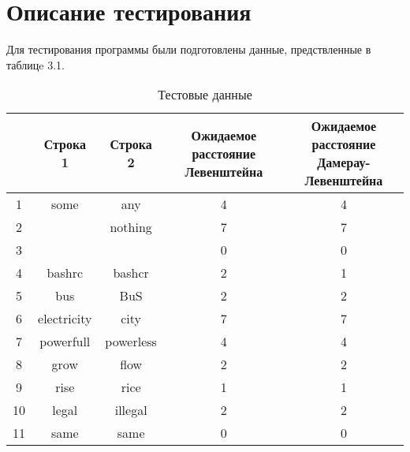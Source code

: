 \section{Описание тестирования}
Для тестирования программы были подготовлены данные, предствленные в таблицe 3.1.

\begin{table}[H]
    \caption{Тестовые данные}
	\begin{tabular}{|c|c|c|c|c|}
 	\hline
    \No{} & Строка 1 & Строка 2 & \makecell{Ожидаемое расстояние\\Левенштейна} & \makecell{Ожидаемое расстояние\\Дамерау-Левенштейна} \\
 	\hline
 	1 & some & any & 4 & 4\\
 	\hline
 	2 & & nothing & 7 & 7\\
 	\hline
 	3 & & & 0 & 0\\
 	\hline
 	4 & bashrc & bashcr & 2 & 1\\
 	\hline
 	5 & bus & BuS & 2 & 2\\
 	\hline
 	6 & electricity & city & 7 & 7\\
 	\hline
 	7 & powerfull & powerless & 4 & 4\\
 	\hline
 	8 & grow & flow & 2 & 2\\
 	\hline
 	9 & rise & rice & 1 & 1\\
 	\hline
    10 & legal & illegal & 2 & 2\\
 	\hline
    11 & same & same & 0 & 0\\
    \hline
	\end{tabular}
\end{table}

